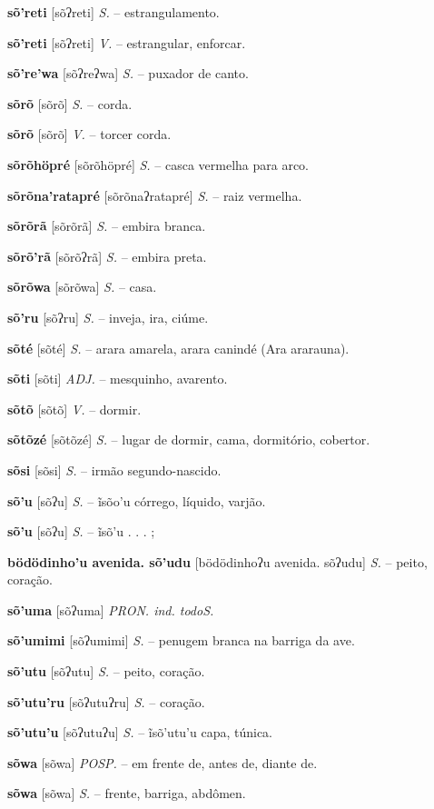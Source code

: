\textbf{sõ'reti} [sõʔreti] \textit{S.} -- estrangulamento.

\textbf{sõ'reti} [sõʔreti] \textit{V.} -- estrangular, enforcar.

\textbf{sõ're'wa} [sõʔreʔwa] \textit{S.} -- puxador de canto.

\textbf{sõrõ} [sõrõ] \textit{S.} -- corda.

\textbf{sõrõ} [sõrõ] \textit{V.} -- torcer corda.

\textbf{sõrõhöpré} [sõrõhöpré] \textit{S.} -- casca vermelha para arco.

\textbf{sõrõna'ratapré} [sõrõnaʔratapré] \textit{S.} -- raiz vermelha.

\textbf{sõrõrã} [sõrõrã] \textit{S.} -- embira branca.

\textbf{sõrõ'rã} [sõrõʔrã] \textit{S.} -- embira preta.

\textbf{sõrõwa} [sõrõwa] \textit{S.} -- casa.

\textbf{sõ'ru} [sõʔru] \textit{S.} -- inveja, ira, ciúme.

\textbf{sõté} [sõté] \textit{S.} -- arara amarela, arara canindé (Ara ararauna).

\textbf{sõti} [sõti] \textit{ADJ.} -- mesquinho, avarento.

\textbf{sõtõ} [sõtõ] \textit{V.} -- dormir.

\textbf{sõtõzé} [sõtõzé] \textit{S.} -- lugar de dormir, cama, dormitório, cobertor.

\textbf{sõsi} [sõsi] \textit{S.} -- irmão segundo-nascido.

\textbf{sõ'u} [sõʔu] \textit{S.} -- ĩsõo'u córrego, líquido, varjão.

\textbf{sõ'u} [sõʔu] \textit{S.} -- ĩsõ'u . . . ;

\textbf{bödödinho'u avenida. sõ'udu} [bödödinhoʔu avenida. sõʔudu] \textit{S.} -- peito, coração.

\textbf{sõ'uma} [sõʔuma] \textit{PRON. ind. todoS.}

\textbf{sõ'umimi} [sõʔumimi] \textit{S.} -- penugem branca na barriga da ave.

\textbf{sõ'utu} [sõʔutu] \textit{S.} -- peito, coração.

\textbf{sõ'utu'ru} [sõʔutuʔru] \textit{S.} -- coração.

\textbf{sõ'utu'u} [sõʔutuʔu] \textit{S.} -- ĩsõ'utu'u capa, túnica.

\textbf{sõwa} [sõwa] \textit{POSP.} -- em frente de, antes de, diante de.

\textbf{sõwa} [sõwa] \textit{S.} -- frente, barriga, abdômen.

